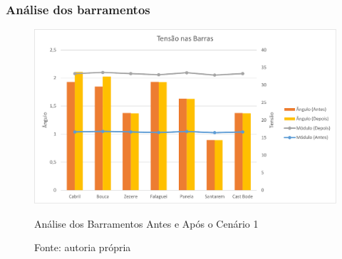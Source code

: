     
\subsubsection{Análise dos barramentos}

\begin{figure}[H]
	\centering
	\captionsetup{width=\textwidth, font=footnotesize, textfont=bf}	
	\includegraphics[width=\linewidth]{img/tensoes_barras_caso1.pdf}
	\caption{Análise dos Barramentos Antes e Após o Cenário 1}
	\vspace{-3.5mm}
	\caption*{Fonte: autoria própria}
	\label{fig:tensoes_barras_caso1}
\end{figure}
